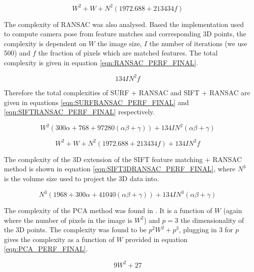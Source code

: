 \begin{equation} \label{eqn:SURF_PERF_FINAL}
W^2 + W + N^2(1972.688 + 213434f)
\end{equation}

The complexity of RANSAC was also analysed. Based the implementation used to compute camera pose from feature matches and corresponding 3D points, the complexity is dependent on $W$ the image size, $I$ the number of iterations (we use 500) and $f$ the fraction of pixels which are matched features. The total complexity is given in equation \ref{eqn:RANSAC_PERF_FINAL}.

\begin{equation} \label{eqn:RANSAC_PERF_FINAL}
134IN^2f
\end{equation}

Therefore the total complexities of SURF + RANSAC and SIFT + RANSAC are given in equations \ref{eqn:SURFRANSAC_PERF_FINAL} and \ref{eqn:SIFTRANSAC_PERF_FINAL} respectively.

\begin{equation} \label{eqn:SIFTRANSAC_PERF_FINAL}
W^2(300\alpha + 768 + 97280(\alpha \beta + \gamma)) + 134IN^2(\alpha \beta + \gamma)
\end{equation}

\begin{equation} \label{eqn:SURFRANSAC_PERF_FINAL}
W^2 + W + N^2(1972.688 + 213434f) + 134IN^2f
\end{equation}

The complexity of the 3D extension of the SIFT feature matching + RANSAC method  is shown in equation \ref{eqn:SIFT3DRANSAC_PERF_FINAL}, where $N^3$ is the volume size used to project the 3D data into.

\begin{equation} \label{eqn:SIFT3DRANSAC_PERF_FINAL}
N^3(1968 + 300\alpha + 41040(\alpha \beta + \gamma)) + 134IN^3(\alpha \beta + \gamma)
\end{equation}

The complexity of the PCA method was found in \cite{Johnstone04Sparse}. It is a function of $W$ (again where the number of pixels in the image is $W^2$) and $p = 3$ the dimensionality of the 3D points. The complexity was found to be $p^2W^2+p^3$, plugging in 3 for $p$ gives the complexity as a function of $W$ provided in equation \ref{eqn:PCA_PERF_FINAL}.

\begin{equation} \label{eqn:PCA_PERF_FINAL}
9W^2 + 27
\end{equation}

